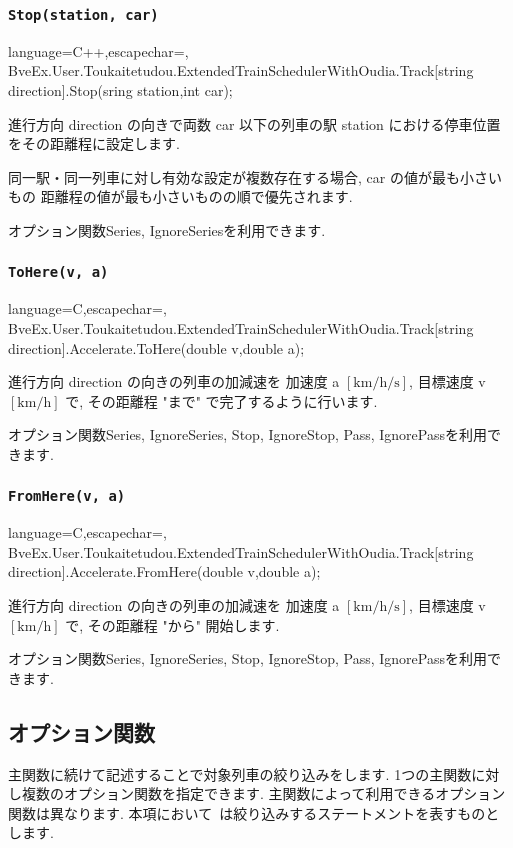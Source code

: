 \documentclass[paper={550pt,2910pt},lualatex , ja=standard]{bxjsreport}
\begin{document}
\subsubsection*{\texttt{Stop(station, car)}}
\begin{reflisting}[]{language=C++,escapechar=\@,}
BveEx.User.Toukaitetudou.ExtendedTrainSchedulerWithOudia.Track[string direction].Stop(sring station,int car);
\end{reflisting}
進行方向 direction の向きで両数 car 以下の列車の駅 station における停車位置をその距離程に設定します.

同一駅・同一列車に対し有効な設定が複数存在する場合, car の値が最も小さいもの 距離程の値が最も小さいものの順で優先されます.

オプション関数Series, IgnoreSeriesを利用できます.

\subsubsection*{\texttt{ToHere(v, a)}}
\begin{reflisting}[]{language=C,escapechar=\@,}
BveEx.User.Toukaitetudou.ExtendedTrainSchedulerWithOudia.Track[string direction].Accelerate.ToHere(double v,double a);
\end{reflisting}
進行方向 direction の向きの列車の加減速を 加速度 a $[\si{\kilo\meter/\hour/\second}]$, 目標速度 v $[\si{\kilo\meter/\hour}]$ で, その距離程 "まで" で完了するように行います.

オプション関数Series, IgnoreSeries, Stop, IgnoreStop, Pass, IgnorePassを利用できます.
\subsubsection*{\texttt{FromHere(v, a)}}
\begin{reflisting}[]{language=C,escapechar=\@,}
BveEx.User.Toukaitetudou.ExtendedTrainSchedulerWithOudia.Track[string direction].Accelerate.FromHere(double v,double a);
\end{reflisting}
    進行方向 direction の向きの列車の加減速を 加速度 a $[\si{\kilo\meter/\hour/\second}]$, 目標速度 v $[\si{\kilo\meter/\hour}]$ で, その距離程 "から" 開始します.
    
    オプション関数Series, IgnoreSeries, Stop, IgnoreStop, Pass, IgnorePassを利用できます.
\subsection*{オプション関数}
主関数に続けて記述することで対象列車の絞り込みをします. 
1つの主関数に対し複数のオプション関数を指定できます. 
主関数によって利用できるオプション関数は異なります.
本項において~は絞り込みするステートメントを表すものとします.
\end{document}
